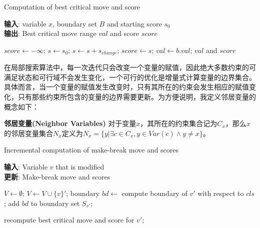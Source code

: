 \begin{algorithm}[t]
    \caption{Computation of best critical move and score}
    \label{alg:score}
    \textbf{输入}: variable $x$, boundary set $B$ and starting score $s_0$\\
    \textbf{输出}: Best critical move range $val$ and score $score$
    \begin{algorithmic}[1] %
        \Statex \hrulefill

        \State $score \leftarrow -\infty$;
        \State $s \leftarrow s_0$;
            \STATE $s \leftarrow s + s_{change}$;
                \STATE $score \leftarrow s$;
                \STATE $val \leftarrow b.val$;
            \ENDIF
        \ENDFOR
        \RETURN $val$ and $score$
    \end{algorithmic}
\end{algorithm}

在局部搜索算法中，每一次迭代只会改变一个变量的赋值，因此绝大多数约束的可满足状态和可行域不会发生变化，一个可行的优化是增量式计算变量的边界集合。具体而言，当一个变量的赋值发生改变时，只有其所在的约束会发生相应的赋值变化，只有那些约束所包含的变量的边界需要更新。为方便说明，我定义邻居变量的概念如下：

\begin{definition}{\textbf{邻居变量(Neighbor Variables)}}
    对于变量$x$，其所在的约束集合记为$C_x$，那么$x$的邻居变量集合$N_x$定义为$N_x = \{y | \exists c \in C_x, y \in Var(c) \land y \neq x\}$。
\end{definition}

\begin{algorithm}[t]
    \caption{Incremental computation of make-break move and scores}
    \label{alg:update}
    \textbf{输入}: Variable $v$ that is modified\\
    \textbf{更新}: Make-break move and scores
    \begin{algorithmic}[1] %
        \Statex \hrulefill

        \State $V \leftarrow \emptyset$;
                \STATE $V \leftarrow V \cup \{v\}'$;
                \STATE boundary $bd \leftarrow $ compute boundary of $v'$ with respect to  $cls$;
                \STATE add $bd$ to boundary set $S_{v'}$;   
            \ENDFOR
        \ENDFOR

            \STATE recompute best critical move and score for $v'$; 
        \ENDFOR
    \end{algorithmic}
\end{algorithm}


